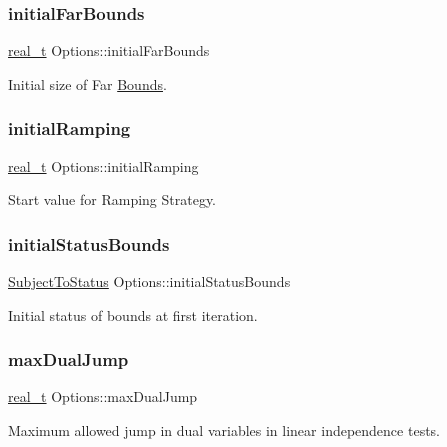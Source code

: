 \subsubsection{\texorpdfstring{initial\+Far\+Bounds}{initialFarBounds}}
{\footnotesize\ttfamily \hyperlink{qp_o_a_s_e_s__wrapper_8h_a0d00e2b3dfadee81331bbb39068570c4}{real\+\_\+t} Options\+::initial\+Far\+Bounds}

Initial size of Far \hyperlink{class_bounds}{Bounds}. \mbox{\label{class_options_ae6f01e48e40c0e90c1d081225824fa69}} 
\subsubsection{\texorpdfstring{initial\+Ramping}{initialRamping}}
{\footnotesize\ttfamily \hyperlink{qp_o_a_s_e_s__wrapper_8h_a0d00e2b3dfadee81331bbb39068570c4}{real\+\_\+t} Options\+::initial\+Ramping}

Start value for Ramping Strategy. \mbox{\label{class_options_af9aaafb64ae87034efa2c916eff51dca}} 
\subsubsection{\texorpdfstring{initial\+Status\+Bounds}{initialStatusBounds}}
{\footnotesize\ttfamily \hyperlink{_types_8hpp_a70a6a40d261a015ead8d43aa589383a4}{Subject\+To\+Status} Options\+::initial\+Status\+Bounds}

Initial status of bounds at first iteration. \mbox{\label{class_options_a0b8e5478791cd5c003882b72a706014f}} 
\subsubsection{\texorpdfstring{max\+Dual\+Jump}{maxDualJump}}
{\footnotesize\ttfamily \hyperlink{qp_o_a_s_e_s__wrapper_8h_a0d00e2b3dfadee81331bbb39068570c4}{real\+\_\+t} Options\+::max\+Dual\+Jump}

Maximum allowed jump in dual variables in linear independence tests. \mbox{\label{class_options_a4b40320e0298e2d21720541b117f5d81}} 
